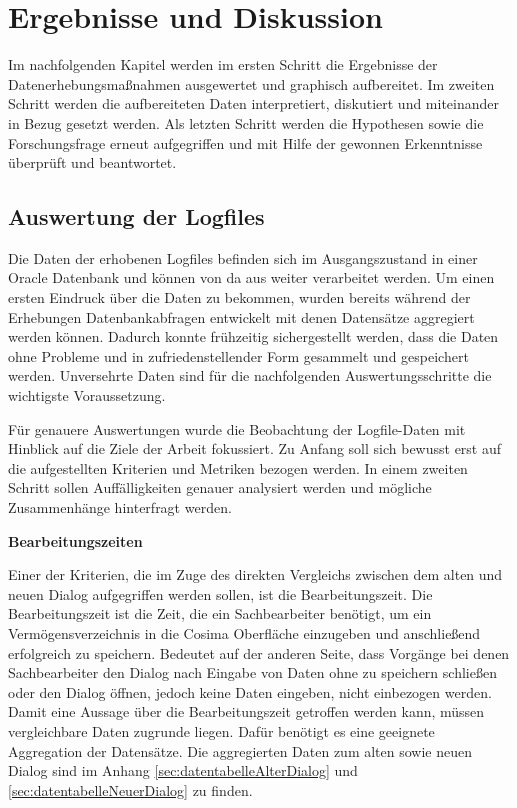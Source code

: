 \section{Ergebnisse und Diskussion}
\label{sec:ergebnisseUndDiskussion}
Im nachfolgenden Kapitel werden im ersten Schritt die Ergebnisse der Datenerhebungsmaßnahmen ausgewertet und graphisch aufbereitet. Im zweiten Schritt werden die aufbereiteten Daten interpretiert, diskutiert und miteinander in Bezug gesetzt werden. Als letzten Schritt werden die Hypothesen sowie die Forschungsfrage erneut aufgegriffen und mit Hilfe der gewonnen Erkenntnisse überprüft und beantwortet.  


\subsection{Auswertung der Logfiles}
\label{sec:auswertungDerLogfiles}
Die Daten der erhobenen Logfiles befinden sich im Ausgangszustand in einer Oracle Datenbank und können von da aus weiter verarbeitet werden. Um einen ersten Eindruck über die Daten zu bekommen, wurden bereits während der Erhebungen Datenbankabfragen entwickelt mit denen Datensätze aggregiert werden können. Dadurch konnte frühzeitig sichergestellt werden, dass die Daten ohne Probleme und in zufriedenstellender Form gesammelt und gespeichert werden. Unversehrte Daten sind für die nachfolgenden Auswertungsschritte die wichtigste Voraussetzung.

Für genauere Auswertungen wurde die Beobachtung der Logfile-Daten mit Hinblick auf die Ziele der Arbeit fokussiert. Zu Anfang soll sich bewusst erst auf die aufgestellten Kriterien und Metriken bezogen werden. In einem zweiten Schritt sollen Auffälligkeiten genauer analysiert werden und mögliche Zusammenhänge hinterfragt werden.

\textbf{Bearbeitungszeiten}

Einer der Kriterien, die im Zuge des direkten Vergleichs zwischen dem alten und neuen Dialog aufgegriffen werden sollen, ist die Bearbeitungszeit. Die Bearbeitungszeit ist die Zeit, die ein Sachbearbeiter benötigt, um ein Vermögensverzeichnis in die Cosima Oberfläche einzugeben und anschließend erfolgreich zu speichern. Bedeutet auf der anderen Seite, dass Vorgänge bei denen Sachbearbeiter den Dialog nach Eingabe von Daten ohne zu speichern schließen oder den Dialog öffnen, jedoch keine Daten eingeben, nicht einbezogen werden. Damit eine Aussage über die Bearbeitungszeit getroffen werden kann, müssen vergleichbare Daten zugrunde liegen. Dafür benötigt es eine geeignete Aggregation der Datensätze. Die aggregierten Daten zum alten sowie neuen Dialog sind im Anhang \ref{sec:datentabelleAlterDialog} und \ref{sec:datentabelleNeuerDialog} zu finden.

